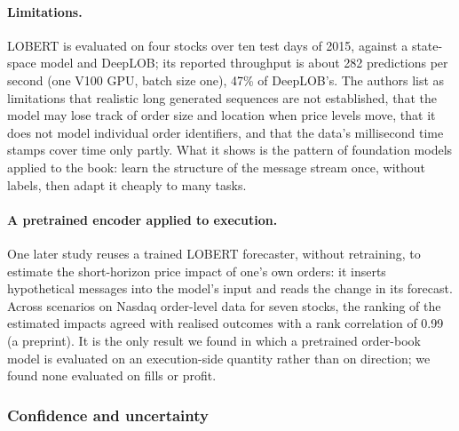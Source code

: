 \paragraph{Limitations.} LOBERT is evaluated on four stocks over ten test days of 2015, against a state-space
model and DeepLOB; its reported throughput is about 282 predictions per second (one V100 GPU, batch size one), 47\%
of DeepLOB's. The authors list as limitations that realistic
long generated sequences are not established, that the model may lose track of order size and location when price
levels move, that it does not model individual order identifiers, and that the data's millisecond time stamps cover
time only partly. What it shows is the pattern of foundation models applied to the book: learn the structure of the
message stream once, without labels, then adapt it cheaply to many tasks.

\paragraph{A pretrained encoder applied to execution.} One later study reuses a trained LOBERT forecaster, without
retraining, to estimate the short-horizon price impact of one's own orders: it inserts hypothetical messages into the
model's input and reads the change in its forecast. Across scenarios on Nasdaq order-level data for seven stocks, the
ranking of the estimated impacts agreed with realised outcomes with a rank correlation of 0.99~\citep{linna2026impact}
(a preprint). It is the only result we found in which a pretrained order-book model is evaluated on an
execution-side quantity rather than on direction; we found none evaluated on fills or profit.

\subsubsection{Confidence and uncertainty}

